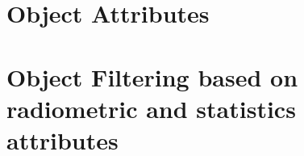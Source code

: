 \section{Object Attributes}\label{sec:ObjectAttributes}


%

\section{Object Filtering based on radiometric and statistics attributes}


%

